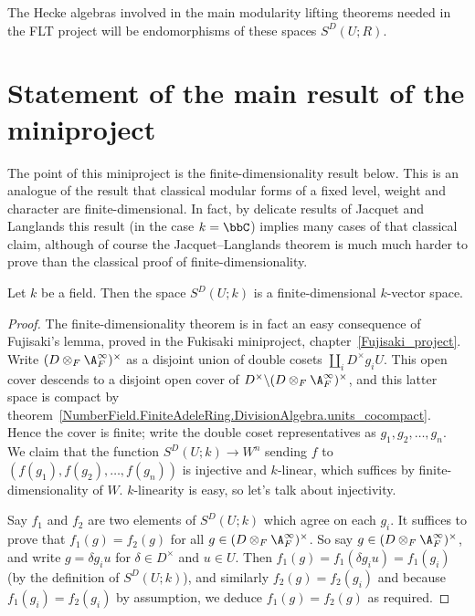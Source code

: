 The Hecke algebras involved in the main modularity lifting
theorems needed in the FLT project will be endomorphisms of these spaces $S^D(U;R)$.

\section{Statement of the main result of the miniproject}

The point of this miniproject is the finite-dimensionality result below.
This is an analogue of the result that classical modular forms of a fixed
level, weight and character are finite-dimensional. In fact, by delicate results
of Jacquet and Langlands this result (in the case $k=\bbC$) implies many cases of that classical claim,
although of course the Jacquet--Langlands theorem is much much harder to prove than the classical
proof of finite-dimensionality.


\begin{theorem}
  \label{TotallyDefiniteQuaternionAlgebra.WeightTwoAutomorphicForm.finiteDimensional}
  Let $k$ be a field. Then the space $S^D(U;k)$ is a finite-dimensional $k$-vector space.
\end{theorem}



\begin{proof}
  The finite-dimensionality theorem is in fact an easy consequence of Fujisaki's lemma,
  proved in the Fukisaki miniproject, chapter~\ref{Fujisaki_project}.
  Write $(D\otimes_F\A_F^\infty)^\times$ as a disjoint union of double cosets
  $\coprod_i D^\times g_i U$. This open cover descends to a disjoint open
  cover of $D^\times\backslash (D\otimes_F\A_F^\infty)^\times$,
  and this latter space is compact by theorem~\ref{NumberField.FiniteAdeleRing.DivisionAlgebra.units_cocompact}.
  Hence the cover is finite; write the double coset representatives
  as $g_1,g_2,\ldots,g_n$. We claim that
  the function $S^D(U;k)\to W^n$ sending $f$ to $(f(g_1),f(g_2),\ldots,f(g_n))$
  is injective and $k$-linear, which suffices by finite-dimensionality of $W$.
  $k$-linearity is easy, so let's talk about injectivity.

  Say $f_1$ and $f_2$ are two elements of $S^D(U;k)$ which agree on
  each $g_i$. It suffices to prove that $f_1(g)=f_2(g)$ for all
  $g\in(D\otimes_F\A_F^\infty)^\times$. So say $g\in(D\otimes_F\A_F^\infty)^\times$,
  and write $g=\delta g_iu$ for $\delta \in D^\times$ and $u\in U$.
  Then $f_1(g)=f_1(\delta g_iu)=f_1(g_i)$ (by the definition of $S^D(U;k)$), and similarly $f_2(g)=f_2(g_i)$
  and because $f_1(g_i)=f_2(g_i)$ by assumption, we deduce $f_1(g)=f_2(g)$ as required.
\end{proof}
